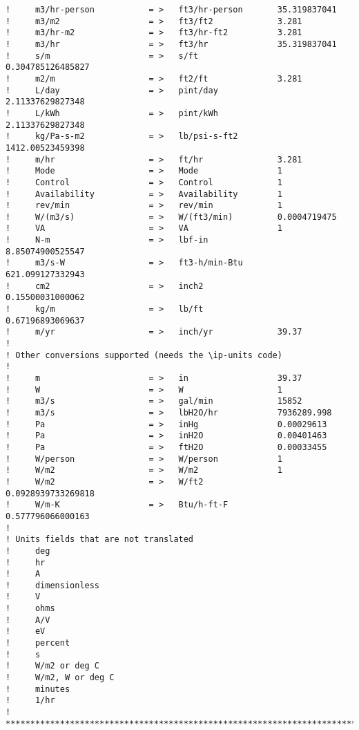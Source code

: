 \begin{lstlisting}
!     m3/hr-person           = >   ft3/hr-person       35.319837041
!     m3/m2                  = >   ft3/ft2             3.281
!     m3/hr-m2               = >   ft3/hr-ft2          3.281
!     m3/hr                  = >   ft3/hr              35.319837041
!     s/m                    = >   s/ft                0.304785126485827
!     m2/m                   = >   ft2/ft              3.281
!     L/day                  = >   pint/day            2.11337629827348
!     L/kWh                  = >   pint/kWh            2.11337629827348
!     kg/Pa-s-m2             = >   lb/psi-s-ft2        1412.00523459398
!     m/hr                   = >   ft/hr               3.281
!     Mode                   = >   Mode                1
!     Control                = >   Control             1
!     Availability           = >   Availability        1
!     rev/min                = >   rev/min             1
!     W/(m3/s)               = >   W/(ft3/min)         0.0004719475
!     VA                     = >   VA                  1
!     N-m                    = >   lbf-in              8.85074900525547
!     m3/s-W                 = >   ft3-h/min-Btu       621.099127332943
!     cm2                    = >   inch2               0.15500031000062
!     kg/m                   = >   lb/ft               0.67196893069637
!     m/yr                   = >   inch/yr             39.37
!
! Other conversions supported (needs the \ip-units code)
!
!     m                      = >   in                  39.37
!     W                      = >   W                   1
!     m3/s                   = >   gal/min             15852
!     m3/s                   = >   lbH2O/hr            7936289.998
!     Pa                     = >   inHg                0.00029613
!     Pa                     = >   inH2O               0.00401463
!     Pa                     = >   ftH2O               0.00033455
!     W/person               = >   W/person            1
!     W/m2                   = >   W/m2                1
!     W/m2                   = >   W/ft2               0.0928939733269818
!     W/m-K                  = >   Btu/h-ft-F          0.577796066000163
!
! Units fields that are not translated
!     deg
!     hr
!     A
!     dimensionless
!     V
!     ohms
!     A/V
!     eV
!     percent
!     s
!     W/m2 or deg C
!     W/m2, W or deg C
!     minutes
!     1/hr
! **************************************************************************
\end{lstlisting}
